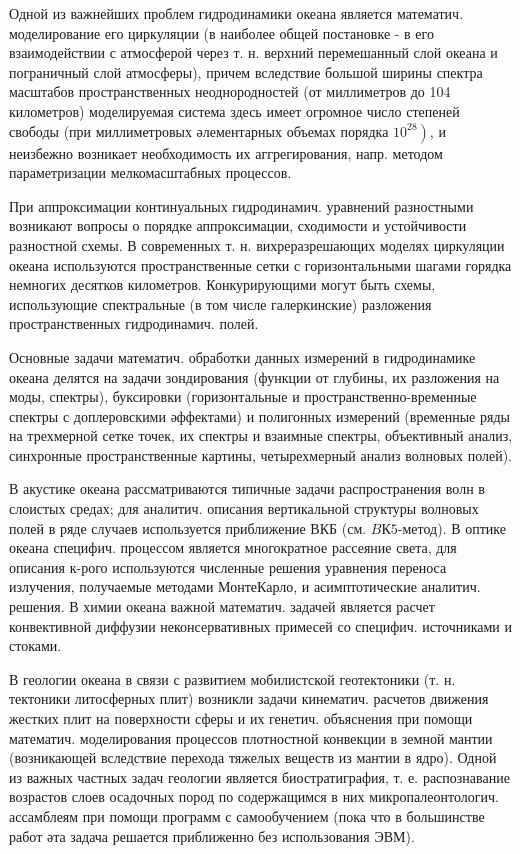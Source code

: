 \documentclass[10pt]{article}
\begin{document}
Одной из важнейших проблем гидродинамики океана является математич. моделирование его циркуляции (в наиболее общей постановке - в его взаимодействии с атмосферой через т. н. верхний перемешанный слой океана и пограничный слой атмосферы), причем вследствие большой ширины спектра масштабов пространственных неоднородностей (от миллиметров до 104 километров) моделируемая система здесь имеет огромное число степеней свободы (при миллиметровых әлементарных объемах порядка $\left.10^{28}\right)$, и неизбежно возникает необходимость их аггрегирования, напр. методом параметризации мелкомасштабных процессов.

При аппроксимации континуальных гидродинамич. уравнений разностными возникают вопросы о порядке аппроксимации, сходимости и устойчивости разностной схемы. В современных т. н. вихреразрешающих моделях циркуляции океана используются пространственные сетки с горизонтальными шагами горядка немногих десятков километров. Конкурирующими могут быть схемы, использующие спектральные (в том числе галеркинские) разложения пространственных гидродинамич. полей.

Основные задачи математич. обработки данных измерений в гидродинамике океана делятся на задачи зондирования (функции от глубины, их разложения на моды, спектры), буксировки (горизонтальные и пространственно-временные спектры с доплеровскими әффектами) и полигонных измерений (временные ряды на трехмерной сетке точек, их спектры и взаимные спектры, объективный анализ, синхронные пространственные картины, четырехмерный анализ волновых полей).

В акустике океана рассматриваются типичные задачи распространения волн в слоистых средах; для аналитич. описания вертикальной структуры волновых полей в ряде случаев используется приближение ВКБ (см. $B К 5$-метод). В оптике океана специфич. процессом является многократное рассеяние света, для описания к-рого используются численные решения уравнения переноса излучения, получаемые методами МонтеКарло, и асимптотические аналитич. решения. В химии океана важной математич. задачей является расчет конвективной диффузии неконсервативных примесей со специфич. источниками и стоками.

В геологии океана в связи с развитием мобилистской геотектоники (т. н. тектоники литосферных плит) возникли задачи кинематич. расчетов движения жестких плит на поверхности сферы и их генетич. объяснения при помощи математич. моделирования процессов плотностной конвекции в земной мантии (возникающей вследствие перехода тяжелых веществ из мантии в ядро). Одной из важных частных задач геологии является биостратиграфия, т. е. распознавание возрастов слоев осадочных пород по содержащимся в них микропалеонтологич. ассамблеям при помощи программ с самообучением (пока что в большинстве работ әта задача решается приближенно без использования ЭВМ).
\end{document}
